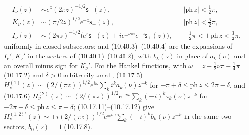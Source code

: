 \begin{itemize}
\begin{align*}
    I_\nu(z)&\sim e^z(2\pi z)^{-1/2}\mathsf s_-(z),&&|\mathrm{ph}\,z|<\tfrac12\pi,\\
    K_\nu(z)&\sim(\pi/2z)^{1/2}e^{-z}\mathsf s_+(z),&&|\mathrm{ph}\,z|<\tfrac32\pi,\\
    I_\nu(z)&\sim(2\pi z)^{-1/2}\bigl(e^z\mathsf s_-(z)\pm ie^{\pm\nu\pi i}e^{-z}\mathsf s_+(z)\bigr),
      &&-\tfrac12\pi<\pm\mathrm{ph}\,z<\tfrac32\pi,
  \end{align*}
  uniformly in closed subsectors; and (10.40.3)--(10.40.4) are the expansions of $I_\nu',K_\nu'$ in the sectors of
  (10.40.1)--(10.40.2), with $b_k(\nu)$ in place of $a_k(\nu)$ and an overall minus sign for $K_\nu'$. For the Hankel
  functions, with $\omega=z-\frac12\nu\pi-\frac14\pi$ (10.17.2) and $\delta>0$ arbitrarily small, (10.17.5)
  $H^{(1)}_\nu(z)\sim(2/(\pi z))^{1/2}e^{i\omega}\sum_ki^ka_k(\nu)z^{-k}$ for $-\pi+\delta\le\mathrm{ph}\,z\le2\pi-\delta$, and
  (10.17.6) $H^{(2)}_\nu(z)\sim(2/(\pi z))^{1/2}e^{-i\omega}\sum_k(-i)^ka_k(\nu)z^{-k}$ for
  $-2\pi+\delta\le\mathrm{ph}\,z\le\pi-\delta$; (10.17.11)--(10.17.12) give $H^{(1,2)\prime}_\nu(z)\sim\pm
  i(2/(\pi z))^{1/2}e^{\pm i\omega}\sum_k(\pm i)^kb_k(\nu)z^{-k}$ in the same two sectors, $b_0(\nu)=1$ (10.17.8).
\end{itemize}
